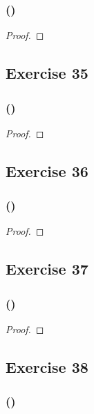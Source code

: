 \documentclass[14pt]{extarticle}
\begin{document}
\subsubsection{()}

\begin{proof}

\end{proof}

\subsection{Exercise 35}

\subsubsection{()}

\begin{proof}

\end{proof}

\subsection{Exercise 36}

\subsubsection{()}

\begin{proof}

\end{proof}

\subsection{Exercise 37}

\subsubsection{()}

\begin{proof}

\end{proof}

\subsection{Exercise 38}

\subsubsection{()}
\end{document}
